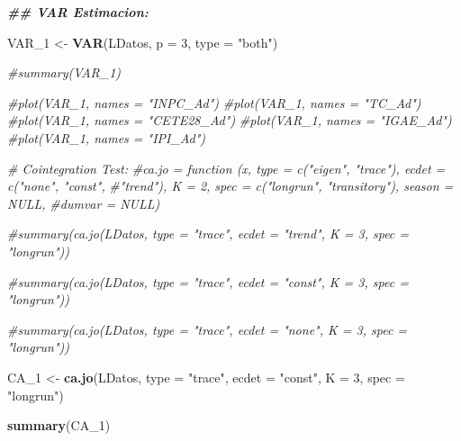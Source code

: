 \documentclass[
]{book}
\newenvironment{Shaded}{\begin{snugshade}}{\end{snugshade}}
\newcommand{\AttributeTok}[1]{\textcolor[rgb]{0.13,0.29,0.53}{#1}}
\newcommand{\CommentTok}[1]{\textcolor[rgb]{0.56,0.35,0.01}{\textit{#1}}}
\newcommand{\DecValTok}[1]{\textcolor[rgb]{0.00,0.00,0.81}{#1}}
\newcommand{\DocumentationTok}[1]{\textcolor[rgb]{0.56,0.35,0.01}{\textbf{\textit{#1}}}}
\newcommand{\FunctionTok}[1]{\textcolor[rgb]{0.13,0.29,0.53}{\textbf{#1}}}
\newcommand{\NormalTok}[1]{#1}
\newcommand{\OtherTok}[1]{\textcolor[rgb]{0.56,0.35,0.01}{#1}}
\newcommand{\StringTok}[1]{\textcolor[rgb]{0.31,0.60,0.02}{#1}}
\begin{document}
\begin{Shaded}
\begin{Highlighting}[]
\DocumentationTok{\#\# VAR Estimacion:}

\NormalTok{VAR\_1 }\OtherTok{\textless{}{-}} \FunctionTok{VAR}\NormalTok{(LDatos, }\AttributeTok{p =} \DecValTok{3}\NormalTok{, }\AttributeTok{type =} \StringTok{"both"}\NormalTok{)}

\CommentTok{\#summary(VAR\_1)}

\CommentTok{\#plot(VAR\_1, names = "INPC\_Ad")}
\CommentTok{\#plot(VAR\_1, names = "TC\_Ad")}
\CommentTok{\#plot(VAR\_1, names = "CETE28\_Ad")}
\CommentTok{\#plot(VAR\_1, names = "IGAE\_Ad")}
\CommentTok{\#plot(VAR\_1, names = "IPI\_Ad")}

\CommentTok{\# Cointegration Test:}
\CommentTok{\#ca.jo = function (x, type = c("eigen", "trace"), ecdet = c("none", "const", }
\CommentTok{\#"trend"), K = 2, spec = c("longrun", "transitory"), season = NULL, }
\CommentTok{\#dumvar = NULL) }

\CommentTok{\#summary(ca.jo(LDatos, type = "trace", ecdet = "trend", K = 3, spec = "longrun"))}

\CommentTok{\#summary(ca.jo(LDatos, type = "trace", ecdet = "const", K = 3, spec = "longrun"))}

\CommentTok{\#summary(ca.jo(LDatos, type = "trace", ecdet = "none", K = 3, spec = "longrun"))}

\NormalTok{CA\_1 }\OtherTok{\textless{}{-}} \FunctionTok{ca.jo}\NormalTok{(LDatos, }\AttributeTok{type =} \StringTok{"trace"}\NormalTok{, }\AttributeTok{ecdet =} \StringTok{"const"}\NormalTok{, }\AttributeTok{K =} \DecValTok{3}\NormalTok{, }\AttributeTok{spec =} \StringTok{"longrun"}\NormalTok{)}

\FunctionTok{summary}\NormalTok{(CA\_1)}
\end{Highlighting}
\end{Shaded}
\end{document}
